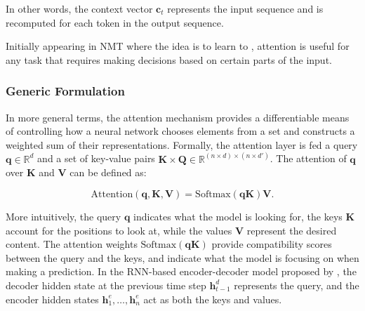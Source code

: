 

In other words, the context vector $\bm{c}_t$ represents the input sequence and is recomputed for each token in the output sequence.

Initially appearing in \ac{NMT} where the idea is to learn to , attention is useful for any task that requires making decisions based on certain parts of the input. 

\subsubsection{Generic Formulation}

In more general terms, the attention mechanism provides a differentiable means of controlling how a neural network chooses elements from a set and constructs a weighted sum of their representations. Formally, the attention layer is fed a query $\bm{q} \in \mathbb{R}^d$ and a set of key-value pairs $\bm{K} \times \bm{Q} \in \mathbb{R}^{(n \times d) \times (n \times d')}$. The attention of $\bm{q}$ over $\bm{K}$ and $\bm{V}$ can be defined as:

\begin{equation}
    \mathrm{Attention}(\bm{q}, \bm{K}, \bm{V}) = \mathrm{Softmax}(\bm{q}\bm{K})\bm{V}.
\label{equation:attention-generic-formulation}
\end{equation}

More intuitively, the query $\bm{q}$ indicates what the model is looking for, the keys $\bm{K}$ account for the positions to look at, while the values $\bm{V}$ represent the desired content. The attention weights $\mathrm{Softmax}(\bm{q}\bm{K})$ provide compatibility scores between the query and the keys, and indicate what the model is focusing on when making a prediction. In the \ac{RNN}-based encoder-decoder model proposed by \citep{bahdanau2014neural}, the decoder hidden state at the previous time step $\bm{h}^d_{t-1}$ represents the query, and the encoder hidden states $\bm{h}^e_{1}, \ldots, \bm{h}^e_{n}$ act as both the keys and values. 

